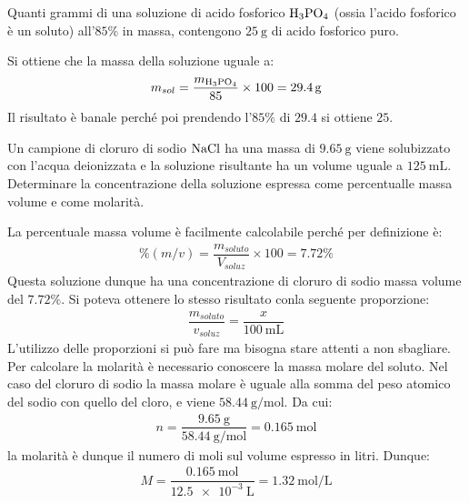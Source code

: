 \documentclass[../AppuntiChimica]{subfiles}
\begin{document}
	\begin{exe}
		Quanti grammi di una soluzione di acido fosforico $ \text{H}_{3}\text{PO}_{4} $ (ossia l'acido fosforico è un soluto) all'$ 85\% $ in massa, contengono $ \SI{25}{\gram} $ di acido fosforico puro.
	\end{exe}
	\begin{svol}
		Si ottiene che la massa della soluzione  uguale a:
		\begin{gather}
		m_{sol}=\dfrac{m_{\text{H}_{3}\text{PO}_{4}}}{85}\times 100 = \SI{29.4}{\gram}
		\end{gather}
		Il risultato è banale perché poi prendendo l'$ 85\% $ di $ 29.4 $ si ottiene $ 25 $.
	\end{svol}
	\begin{exe}
		Un campione di cloruro di sodio $ \text{NaCl} $ ha una massa di $ \SI{9.65}{\gram} $ viene solubizzato con l'acqua deionizzata e la soluzione risultante ha un volume uguale a $ \SI{125}{\milli\liter} $. Determinare la concentrazione della soluzione espressa come percentualle massa volume e come molarità.
	\end{exe}
	\begin{svol}
		La percentuale massa volume è facilmente calcolabile perché per definizione è:
		\begin{gather}
		\%(m/v)=\dfrac{m_{soluto}}{V_{soluz}}\times 100=7.72\%
		\end{gather}
		Questa soluzione dunque ha una concentrazione di cloruro di sodio massa volume del $ 7.72\% $. Si poteva ottenere lo stesso risultato conla seguente proporzione:
		\begin{gather}
		\dfrac{m_{soluto}}{v_{soluz}}=\dfrac{x}{\SI{100}{\milli\liter}}
		\end{gather}
		L'utilizzo delle proporzioni si può fare ma bisogna stare attenti a non sbagliare. Per calcolare la molarità è necessario conoscere la massa molare del soluto. Nel caso del cloruro di sodio la massa molare è uguale alla somma del peso atomico del sodio con quello del cloro, e viene $ \SI{58.44}{\gram\per\mole} $. Da cui:
		\begin{gather}
		n=\dfrac{\SI{9.65}{\gram}}{\SI{58.44}{\gram\per\mole}}=\SI{0.165}{\mole}
		\end{gather}
		la molarità è dunque il numero  di moli sul volume espresso in litri. Dunque:
		\begin{gather}
		M=\dfrac{\SI{0.165}{\mole}}{\SI{12.5e-3}{\liter}}=\SI{1.32}{\mole\per\liter}
		\end{gather}
	\end{svol}
\end{document}
